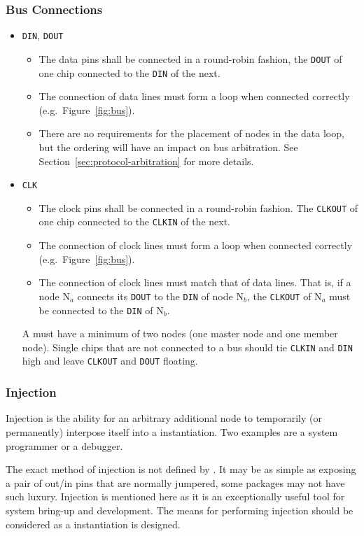 \subsubsection{Bus Connections}
\label{sec:physical-bus}
\begin{itemize}
  \item {\tt DIN}, {\tt DOUT}
  \begin{itemize}
    \item The data pins shall be connected in a round-robin fashion, the
      {\tt DOUT} of one chip connected to the {\tt DIN} of the next.
    \item The connection of data lines must form a loop when connected
      correctly (e.g.~Figure~\ref{fig:bus}).
    \item There are no requirements for the placement of nodes in the data
      loop, but the ordering will have an impact on bus arbitration. See
      Section~\ref{sec:protocol-arbitration} for more details.
  \end{itemize}
  \item {\tt CLK}
  \begin{itemize}
    \item The clock pins shall be connected in a round-robin fashion. The
      {\tt CLKOUT} of one chip connected to the {\tt CLKIN} of the next.
    \item The connection of clock lines must form a loop when connected
      correctly (e.g.~Figure~\ref{fig:bus}).
    \item The connection of clock lines must match that of data lines. That
      is, if a node N$_{a}$ connects its {\tt DOUT} to the {\tt DIN} of node
      N$_{b}$, the {\tt CLKOUT} of N$_{a}$ must be connected to the {\tt DIN}
      of N$_{b}$.
  \end{itemize}
  A \bus must have a minimum of two nodes (one master node and one
  member node). Single chips that are not connected to a bus should tie
  {\tt CLKIN} and {\tt DIN} high and leave {\tt CLKOUT} and {\tt DOUT}
  floating.
\end{itemize}


\subsubsection{Injection}
Injection is the ability for an arbitrary additional node to temporarily (or
permanently) interpose itself into a \bus instantiation. Two examples are a
system programmer or a debugger.

The exact method of injection is not defined by \bus. It may be as simple as
exposing a pair of out/in pins that are normally jumpered, some packages may
not have such luxury. Injection is mentioned here as it is an exceptionally
useful tool for system bring-up and development. The means for performing
injection should be considered as a \bus instantiation is designed.

